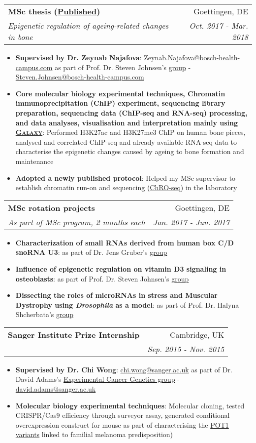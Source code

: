 \documentclass[legalpaper,11pt]{article}
\makeatletter
\newcommand{\resumeItem}[2]{
  \item\small{
    \textbf{#1}{: #2 \vspace{-2pt}}
  }
}
\newcommand{\resumeSubheading}[4]{
  \vspace{-1pt}\item
    \begin{tabular*}{0.97\textwidth}[t]{l@{\extracolsep{\fill}}r}
      \textbf{#1} & #2 \\
      \textit{\small#3} & \textit{\small #4} \\
    \end{tabular*}\vspace{-5pt}
}
\newcommand{\resumeItemListStart}{\begin{itemize}}
\newcommand{\resumeItemListEnd}{\end{itemize}\vspace{-5pt}}
\makeatother
\begin{document}
     \newpage
     
     \resumeSubheading
      {MSc thesis (\href{https://doi.org/10.1038/s41418-020-00614-w}{Published})}{Goettingen, DE}
      {Epigenetic regulation of ageing-related changes in bone}{Oct. 2017 - Mar. 2018}
      \resumeItemListStart
        \resumeItem{Supervised by Dr. Zeynab Najafova}{\href{mailto: Zeynab.Najafova@bosch-health-campus.com}{Zeynab.Najafova@bosch-health-campus.com} as part of Prof. Dr. Steven Johnsen's \href{https://johnsenlab.wordpress.com/}{group} - \href{mailto:Steven.Johnsen@bosch-health-campus.com}{Steven.Johnsen@bosch-health-campus.com}}
        \resumeItem{Core molecular biology experimental techniques, Chromatin immunoprecipitation (ChIP) experiment, sequencing library preparation, sequencing data (ChIP-seq and RNA-seq) processing, and data analyses, visualisation and interpretation mainly using \href{https://usegalaxy.org/}{\textsc{Galaxy}}}{Performed H3K27ac and H3K27me3 ChIP on human bone pieces, analysed and correlated ChIP-seq and already available RNA-seq data to characterise the epigenetic changes caused by ageing to bone formation and maintenance}
        \resumeItem{Adopted a newly published protocol}{Helped my MSc supervisor to establish chromatin run-on and sequencing (\href{https://www.nature.com/articles/s41588-018-0244-3#data-availability}{ChRO-seq}) in the laboratory}
     \resumeItemListEnd

     \resumeSubheading
      {MSc rotation projects}{Goettingen, DE}
      {As part of MSc program, 2 months each}{Jan. 2017 - Jun. 2017}
      \resumeItemListStart
        \resumeItem{Characterization of small RNAs derived from human box C/D snoRNA U3}{as part of Dr. Jens Gruber's \href{https://bio-protocol.org/UserHome.aspx?id=1032127}{group}}
        \resumeItem{Influence of epigenetic regulation on vitamin D3 signaling in osteoblasts}{as part of Prof. Dr. Steven Johnsen's \href{https://johnsenlab.wordpress.com/}{group}}
        \resumeItem{Dissecting the roles of microRNAs in stress and Muscular Dystrophy using \textit{Drosophila} as a model}{as part of Prof. Dr. Halyna Shcherbata's \href{https://shcherbatalab.wordpress.com/}{group}}
     \resumeItemListEnd

     \resumeSubheading
      {Sanger Institute Prize Internship}{Cambridge, UK}
      {}{Sep. 2015 - Nov. 2015}
      \resumeItemListStart
        \resumeItem{Supervised by Dr. Chi Wong}{\href{mailto: chi.wong@sanger.ac.uk}{chi.wong@sanger.ac.uk} as part of Dr. David Adams's \href{https://www.sanger.ac.uk/group/adams-group/}{Experimental Cancer Genetics group} - \href{mailto:david.adams@sanger.ac.uk}{david.adams@sanger.ac.uk}}
        \resumeItem{Molecular biology experimental techniques}
          {Molecular cloning, tested CRISPR/Cas9 efficiency through surveyor assay, generated conditional overexpression construct for mouse as part of characterising the \href{https://www.nature.com/articles/ng.2947}{POT1 variants} linked to familial melanoma predisposition)}
     \resumeItemListEnd
     
\end{document}
